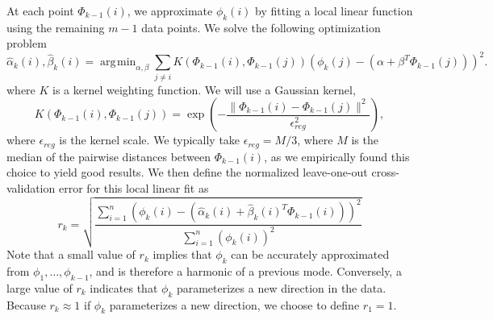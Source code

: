 \documentclass[preprint]{elsarticle}
\DeclareMathOperator*{\argmin}{\arg\!\min}
\begin{document}
At each point $\Phi_{k-1}(i)$, we approximate $\phi_k(i)$ by fitting a local linear function using the remaining $m-1$ data points. 
%
We solve the following optimization problem 
\begin{equation} \label{eq:opt_problem}
\hat{\alpha}_k (i) , \hat{\beta}_k(i)  = \argmin_{\alpha, \beta} \sum_{j \ne i} K(\Phi_{k-1}(i), \Phi_{k-1}(j)) \left( \phi_{k}(j) - (\alpha + \beta^T \Phi_{k-1}(j)) \right)^2.
\end{equation}
%
where $K$ is a kernel weighting function.
%
We will use a Gaussian kernel, 
%
\begin{equation}
K(\Phi_{k-1}(i), \Phi_{k-1}(j))  = \exp \left( - \frac{\|\Phi_{k-1}(i) - \Phi_{k-1} (j) \|^2}{\epsilon_{reg}^2} \right),
\end{equation}
%
where $\epsilon_{reg}$ is the kernel scale. 
%
We typically take $\epsilon_{reg} = M / 3$, where $M$ is the median of the pairwise distances between $\Phi_{k-1}(i)$, as we empirically found this choice to yield good results. 
%
We then define the normalized leave-one-out cross-validation error for this local linear fit as
\begin{equation} \label{eq:cv_error}
r_{k} = \sqrt{ \frac{\sum_{i=1}^n \left( \phi_{k} (i) - (\hat{\alpha}_k(i) + \hat{\beta}_k(i)^T \Phi_{k-1}(i))  \right)^2} {\sum_{i=1}^n  \left( \phi_{k} (i) \right)^2 }}
\end{equation}
%
Note that a small value of $r_k$ implies that $\phi_{k}$ can be accurately approximated from $\phi_1, \dots, \phi_{k-1}$, and is therefore a harmonic of a previous mode.
%
Conversely, a large value of $r_{k}$ indicates that $\phi_{k}$ parameterizes a new direction in the data.
%
Because $r_{k} \approx 1$ if $\phi_{k}$ parameterizes a new direction, we choose to define $r_1 = 1$.
\end{document}
